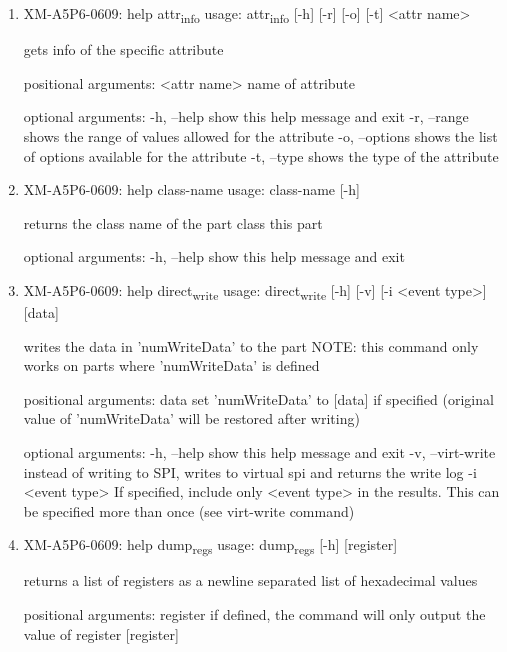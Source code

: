 \documentclass[11pt]{article}
\begin{document}
\begin{enumerate}
\item XM-A5P6-0609: help attr\textsubscript{info}
\label{sec:org19e498d}
usage: attr\textsubscript{info} [-h] [-r] [-o] [-t] <attr name>

gets info of the specific attribute

positional arguments:
  <attr name>    name of attribute

optional arguments:
  -h, --help     show this help message and exit
  -r, --range    shows the range of values allowed for the attribute
  -o, --options  shows the list of options available for the attribute
  -t, --type     shows the type of the attribute

\item XM-A5P6-0609: help class-name
\label{sec:orgb09b6b4}
usage: class-name [-h]

returns the class name of the part class this part

optional arguments:
  -h, --help  show this help message and exit

\item XM-A5P6-0609: help direct\textsubscript{write}
\label{sec:orgec7a0f4}
usage: direct\textsubscript{write} [-h] [-v] [-i <event type>] [data]

writes the data in 'numWriteData' to the part NOTE: this command only works on
parts where 'numWriteData' is defined

positional arguments:
  data              set 'numWriteData' to [data] if specified (original value
                    of 'numWriteData' will be restored after writing)

optional arguments:
  -h, --help        show this help message and exit
  -v, --virt-write  instead of writing to SPI, writes to virtual spi and
                    returns the write log
  -i <event type>   If specified, include only <event type> in the results.
                    This can be specified more than once (see virt-write
                    command)

\item XM-A5P6-0609: help dump\textsubscript{regs}
\label{sec:orgc371ce4}
usage: dump\textsubscript{regs} [-h] [register]

returns a list of registers as a newline separated list of hexadecimal values

positional arguments:
  register    if defined, the command will only output the value of register
              [register]


\end{enumerate}
\end{document}
